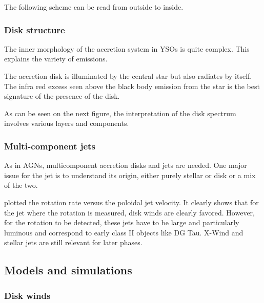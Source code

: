\documentclass[10pt,a4paper,english]{article}
\begin{document}
The following scheme can be read from outside to inside.


\subsubsection{Disk structure}

The inner morphology of the accretion system in YSOs is quite complex. This
explains the variety of emissions.


The accretion disk is illuminated by the central star but also radiates by
itself. The infra red excess seen above the black body emission from the star
is the best signature of the presence of the disk.


As can be seen on the next figure, the interpretation of the disk spectrum
involves various layers and components.


\subsubsection{Multi-component jets}


As in AGNs, multicomponent accretion disks and jets are needed. One major issue
for the jet is to understand its origin, either purely stellar or disk or a mix
of the two.


\cite{2006A&A...453..785F} plotted the rotation rate versus the poloidal jet
velocity. It clearly shows that for the jet where the rotation is measured,
disk winds are clearly favored. However, for the rotation to be detected, these
jets have to be large and particularly luminous and correspond to early class
II objects like DG Tau. X-Wind and stellar jets are still relevant for later
phases.


\subsection{Models and simulations}

\subsubsection{Disk winds}
\end{document}
